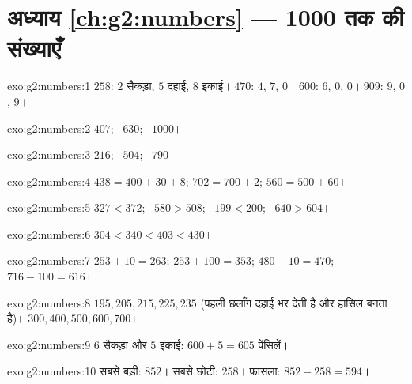 \section*{अध्याय \ref{ch:g2:numbers} --- 1000 तक की संख्याएँ}

\begin{solution}{exo:g2:numbers:1}
$258$: $2$ सैकड़ा, $5$ दहाई, $8$ इकाई। $470$: $4$, $7$, $0$।
$600$: $6$, $0$, $0$। $909$: $9$, $0$, $9$।
\end{solution}

\begin{solution}{exo:g2:numbers:2}
$407$; \ $630$; \ $1000$।
\end{solution}

\begin{solution}{exo:g2:numbers:3}
$216$; \ $504$; \ $790$।
\end{solution}

\begin{solution}{exo:g2:numbers:4}
$438 = 400 + 30 + 8$; \quad $702 = 700 + 2$; \quad
$560 = 500 + 60$।
\end{solution}

\begin{solution}{exo:g2:numbers:5}
$327 < 372$; \ $580 > 508$; \ $199 < 200$; \ $640 > 604$।
\end{solution}

\begin{solution}{exo:g2:numbers:6}
$304 < 340 < 403 < 430$।
\end{solution}

\begin{solution}{exo:g2:numbers:7}
$253 + 10 = 263$; \quad $253 + 100 = 353$; \quad
$480 - 10 = 470$; \quad $716 - 100 = 616$।
\end{solution}

\begin{solution}{exo:g2:numbers:8}
$195, 205, 215, 225, 235$ (पहली छलाँग दहाई भर देती है और हासिल
बनता है)। $300, 400, 500, 600, 700$।
\end{solution}

\begin{solution}{exo:g2:numbers:9}
$6$ सैकड़ा और $5$ इकाई: $600 + 5 = 605$ पेंसिलें।
\end{solution}

\begin{solution}{exo:g2:numbers:10}
सबसे बड़ी: $852$। सबसे छोटी: $258$। फ़ासला:
$852 - 258 = 594$।
\end{solution}

